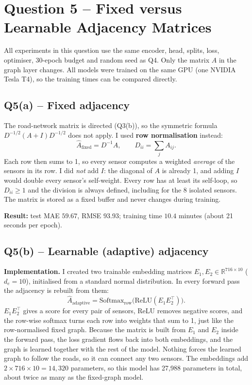 \documentclass[11pt, a4paper]{article}
\begin{document}
\section*{Question 5 -- Fixed versus Learnable Adjacency Matrices}

All experiments in this question use the same encoder, head, splits, loss, optimiser, 30-epoch budget and random seed as Q4. Only the matrix $\hat{A}$ in the graph layer changes. All models were trained on the same GPU (one NVIDIA Tesla T4), so the training times can be compared directly.

\subsection*{Q5(a) -- Fixed adjacency}

The road-network matrix is directed (Q3(b)), so the symmetric formula $D^{-1/2}(A + I)D^{-1/2}$ does not apply. I used \textbf{row normalisation} instead:
\[
\hat{A}_{\text{fixed}} = D^{-1} A, \qquad D_{ii} = \sum_j A_{ij}.
\]
Each row then sums to 1, so every sensor computes a weighted \emph{average} of the sensors in its row. I did \emph{not} add $I$: the diagonal of $A$ is already 1, and adding $I$ would double every sensor's self-weight. Every row has at least its self-loop, so $D_{ii} \geq 1$ and the division is always defined, including for the 8 isolated sensors. The matrix is stored as a fixed buffer and never changes during training.

\textbf{Result:} test MAE $59.67$, RMSE $93.93$; training time $10.4$ minutes (about 21 seconds per epoch).

\subsection*{Q5(b) -- Learnable (adaptive) adjacency}

\textbf{Implementation.} I created two trainable embedding matrices $E_1, E_2 \in \mathbb{R}^{716 \times 10}$ ($d_e = 10$), initialised from a standard normal distribution. In every forward pass the adjacency is rebuilt from them:
\[
\hat{A}_{\text{adaptive}} = \mathrm{Softmax}_{\text{row}}\big(\mathrm{ReLU}(E_1 E_2^{\top})\big).
\]
$E_1 E_2^\top$ gives a score for every pair of sensors, ReLU removes negative scores, and the row-wise softmax turns each row into weights that sum to 1, just like the row-normalised fixed graph. Because the matrix is built from $E_1$ and $E_2$ inside the forward pass, the loss gradient flows back into both embeddings, and the graph is learned together with the rest of the model. Nothing forces the learned graph to follow the roads, so it can connect any two sensors. The embeddings add $2 \times 716 \times 10 = 14{,}320$ parameters, so this model has 27{,}988 parameters in total, about twice as many as the fixed-graph model.
\end{document}
